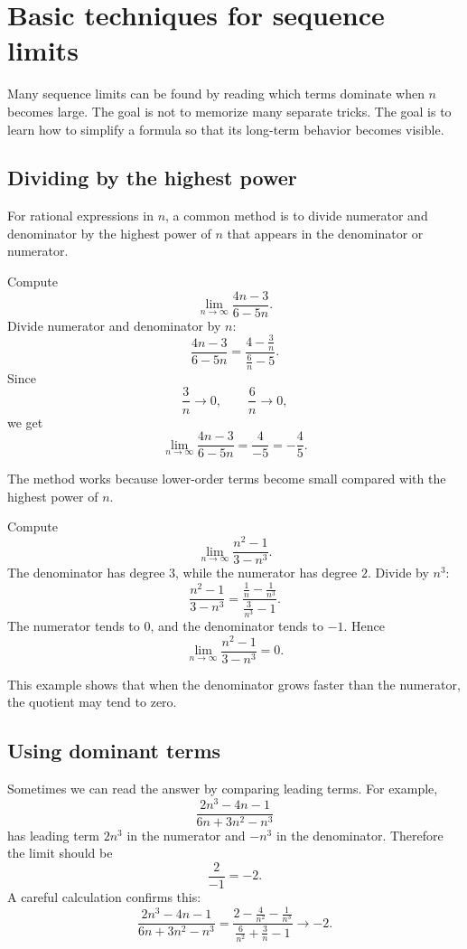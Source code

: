 \section{Basic techniques for sequence limits}

Many sequence limits can be found by reading which terms dominate when \(n\) becomes large. The goal is not to memorize many separate tricks. The goal is to learn how to simplify a formula so that its long-term behavior becomes visible.

\subsection*{Dividing by the highest power}

For rational expressions in \(n\), a common method is to divide numerator and denominator by the highest power of \(n\) that appears in the denominator or numerator.

\begin{examplebox}
Compute
\[
\lim_{n\to\infty}\frac{4n-3}{6-5n}.
\]
Divide numerator and denominator by \(n\):
\[
\frac{4n-3}{6-5n}=\frac{4-\frac3n}{\frac6n-5}.
\]
Since
\[
\frac3n\to0,
\qquad
\frac6n\to0,
\]
we get
\[
\lim_{n\to\infty}\frac{4n-3}{6-5n}=\frac{4}{-5}=-\frac45.
\]
\end{examplebox}

The method works because lower-order terms become small compared with the highest power of \(n\).

\begin{examplebox}
Compute
\[
\lim_{n\to\infty}\frac{n^2-1}{3-n^3}.
\]
The denominator has degree \(3\), while the numerator has degree \(2\). Divide by \(n^3\):
\[
\frac{n^2-1}{3-n^3}
=
\frac{\frac1n-\frac1{n^3}}{\frac3{n^3}-1}.
\]
The numerator tends to \(0\), and the denominator tends to \(-1\). Hence
\[
\lim_{n\to\infty}\frac{n^2-1}{3-n^3}=0.
\]
\end{examplebox}

This example shows that when the denominator grows faster than the numerator, the quotient may tend to zero.

\subsection*{Using dominant terms}

Sometimes we can read the answer by comparing leading terms. For example,
\[
\frac{2n^3-4n-1}{6n+3n^2-n^3}
\]
has leading term \(2n^3\) in the numerator and \(-n^3\) in the denominator. Therefore the limit should be
\[
\frac{2}{-1}=-2.
\]
A careful calculation confirms this:
\[
\frac{2n^3-4n-1}{6n+3n^2-n^3}
=
\frac{2-\frac4{n^2}-\frac1{n^3}}{\frac6{n^2}+\frac3n-1}\to -2.
\]

